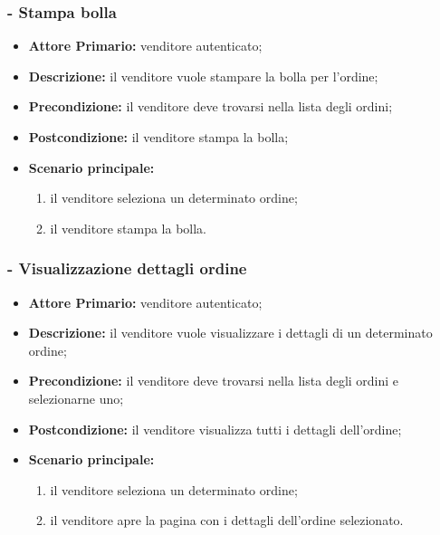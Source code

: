 \stepsubUserCase
\subsubsection{- Stampa bolla}
\begin{itemize}
    \item \textbf{Attore Primario:} venditore autenticato;
    \item \textbf{Descrizione:} il venditore vuole stampare la bolla per l'ordine;
    \item \textbf{Precondizione:} il venditore deve trovarsi nella lista degli ordini;
    \item \textbf{Postcondizione:} il venditore stampa la bolla;
    \item \textbf{Scenario principale:}
          \begin{enumerate}
              \item il venditore seleziona un determinato ordine;
              \item il venditore stampa la bolla.
          \end{enumerate}
\end{itemize}

\stepsubUserCase
\subsubsection{- Visualizzazione dettagli ordine}
\begin{itemize}
    \item \textbf{Attore Primario:} venditore autenticato;
    \item \textbf{Descrizione:} il venditore vuole visualizzare i dettagli di un determinato ordine;
    \item \textbf{Precondizione:} il venditore deve trovarsi nella lista degli ordini e selezionarne uno;
    \item \textbf{Postcondizione:} il venditore visualizza tutti i dettagli dell'ordine;
    \item \textbf{Scenario principale:}
          \begin{enumerate}
              \item il venditore seleziona un determinato ordine;
              \item il venditore apre la pagina con i dettagli dell'ordine selezionato.
          \end{enumerate}
\end{itemize}

